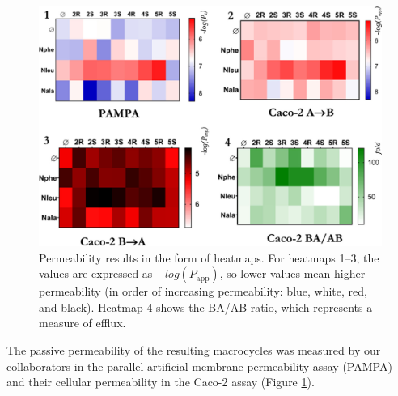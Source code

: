 \begin{figure}[h!]
    \centering
    \includegraphics[width=\textwidth]{7_chapter_5/fig/intro/pampa.jpeg}
    \caption{Permeability results in the form of heatmaps. For heatmaps 1–3, the values are expressed as $−log(P_{\text{app}})$, so lower values mean higher permeability (in order of increasing permeability: blue, white, red, and black). Heatmap 4 shows the BA/AB ratio, which represents a measure of efflux.}
    \label{fig:permAssays}
\end{figure}
The passive permeability of the resulting macrocycles was measured by our collaborators in the parallel artificial membrane permeability assay (PAMPA) and their cellular permeability in the Caco-2 assay (Figure \ref{fig:permAssays}).\cite{Di2015}

